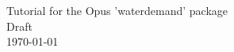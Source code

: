 \documentclass[fleqn]{howto}
\begin{document}
\begin{center}
{\Large Tutorial for the Opus 'waterdemand' package}\\[5mm]
{\large Draft}\\[2mm]
\today
\end{center}
\end{document}
